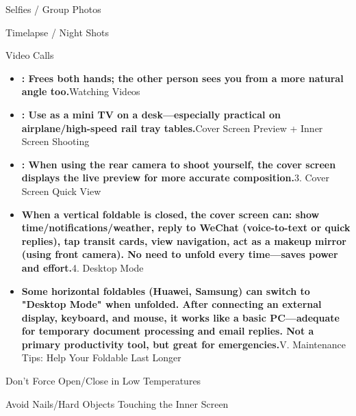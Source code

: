 
Selfies / Group Photos


Timelapse / Night Shots


Video Calls

\begin{itemize}
  \item \textbf{: Frees both hands; the other person sees you from a more natural angle too.}Watching Videos
  \item \textbf{: Use as a mini TV on a desk—especially practical on airplane/high-speed rail tray tables.}Cover Screen Preview + Inner Screen Shooting
  \item \textbf{: When using the rear camera to shoot yourself, the cover screen displays the live preview for more accurate composition.}3. Cover Screen Quick View
  \item \textbf{When a vertical foldable is closed, the cover screen can: show time/notifications/weather, reply to WeChat (voice-to-text or quick replies), tap transit cards, view navigation, act as a makeup mirror (using front camera). No need to unfold every time—saves power and effort.}4. Desktop Mode
  \item \textbf{Some horizontal foldables (Huawei, Samsung) can switch to "Desktop Mode" when unfolded. After connecting an external display, keyboard, and mouse, it works like a basic PC—adequate for temporary document processing and email replies. Not a primary productivity tool, but great for emergencies.}V. Maintenance Tips: Help Your Foldable Last Longer
\end{itemize}


Don't Force Open/Close in Low Temperatures


Avoid Nails/Hard Objects Touching the Inner Screen

